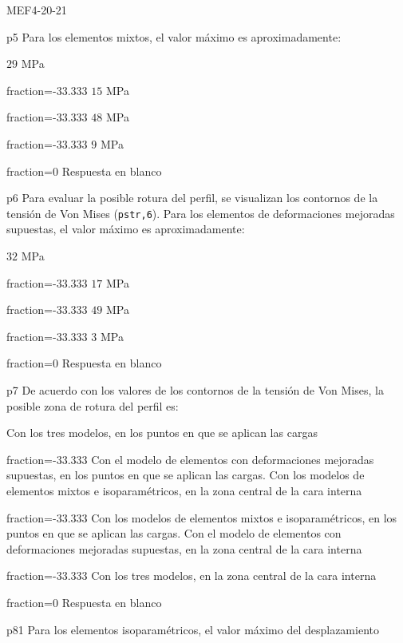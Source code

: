 \documentclass[a4paper]{article}
\begin{document}
\begin{quiz}{MEF4-20-21}
\begin{multi}{p5}
	Para los elementos mixtos, el valor m\'aximo es aproximadamente:
	\item* $29$ MPa
	\item[fraction=-33.333] $15$ MPa
	\item[fraction=-33.333] $48$ MPa
	\item[fraction=-33.333] $9$ MPa
	\item[fraction=0] Respuesta en blanco
\end{multi}
\begin{multi}{p6}
	Para evaluar la posible rotura del perfil, se visualizan 
	los contornos de la tensi\'on de Von Mises ({\tt pstr,6}).
	Para los elementos de deformaciones mejoradas supuestas, el valor m\'aximo
	es aproximadamente:
	\item* $32$ MPa
	\item[fraction=-33.333] $17$ MPa
	\item[fraction=-33.333] $49$ MPa
	\item[fraction=-33.333] $3$ MPa
	\item[fraction=0] Respuesta en blanco
\end{multi}
\begin{multi}{p7}
De acuerdo con los valores de los contornos de la tensi\'on de
Von Mises, la posible zona de rotura del perfil es:
\item* Con los tres modelos, en los puntos en que se aplican las cargas
\item[fraction=-33.333] Con el modelo de elementos con deformaciones mejoradas
supuestas, en los puntos en que se aplican las cargas. Con los modelos de
elementos mixtos e isoparam\'etricos, en la zona central de la cara interna
\item[fraction=-33.333] Con los modelos de elementos mixtos e isoparam\'etricos,
en los puntos en que se aplican las cargas. Con el modelo de elementos con
deformaciones mejoradas supuestas, en la zona central de la cara interna
\item[fraction=-33.333] Con los tres modelos, en la zona central de la cara
interna
\item[fraction=0] Respuesta en blanco
\end{multi}
\begin{multi}{p81}
	Para los elementos isoparam\'etricos, el valor m\'aximo del desplazamiento

\end{multi}
\end{quiz}
\end{document}
